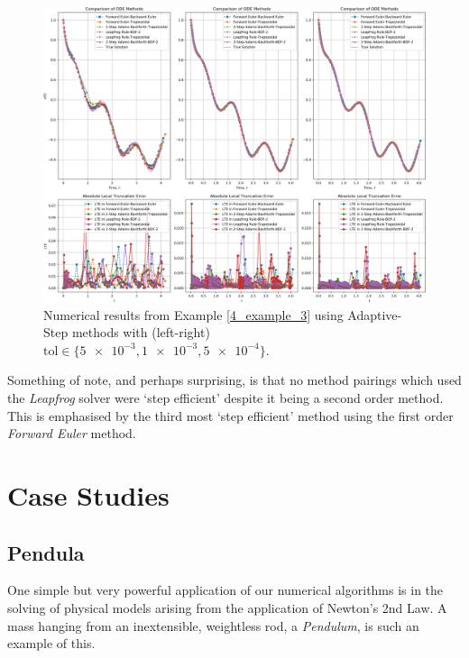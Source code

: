 \documentclass[12pt, twoside]{report}
\theoremstyle{plain}
\theoremstyle{definition}
\theoremstyle{definition}
\begin{document}
        \begin{figure}
            \centering
                \includegraphics[width=\columnwidth]{3}
                \caption[caption]{Numerical results from Example 
                \ref{4_example_3} using Adaptive-Step methods with (left-right) \\
                $\text{tol}\in\lbrace\num{5e-3},\num{1e-3},
                \num{5e-4}\rbrace$.}
                \label{4_ex_3_graphs}
        \end{figure}

        Something of note, and perhaps surprising, is that no method pairings
        which used the \textit{Leapfrog} solver were `step efficient' despite 
        it being a second order method. This is emphasised by the third most
        `step efficient' method using the first order \textit{Forward Euler}
        method. 


    
\chapter{Case Studies}
\label{5_case_studies}
    \section{Pendula}
    \label{5_pendula}
        One simple but very powerful application of our numerical algorithms
        is in the solving of physical models arising from the application of
        Newton's 2nd Law. A mass hanging from an inextensible, weightless
        rod, a \textit{Pendulum}, is such an example of this.
\end{document}
